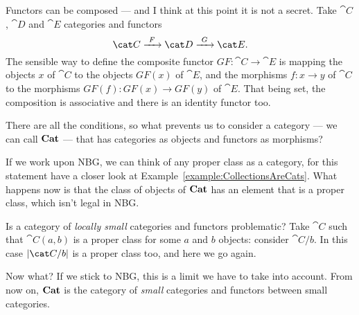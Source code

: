 
Functors can be composed --- and I think at this point it is not a
secret. Take \(\cat C\), \(\cat D\) and \(\cat E\) categories and
functors
\[\cat C \functo F \cat D \functo G \cat E .\]
The sensible way to define the composite functor
\(GF : \cat C \to \cat E\) is mapping the objects \(x\) of \(\cat C\)
to the objects \(GF(x)\) of \(\cat E\), and the morphisms
\(f : x \to y\) of \(\cat C\) to the morphisms
\(GF(f) : GF(x) \to GF(y)\) of \(\cat E\). That being set, the
composition is associative and there is an identity functor too.

There are all the conditions, so what prevents us to consider a
category --- we can call \(\bf Cat\) --- that has categories as
objects and functors as morphisms?

If we work upon NBG, we can think of any proper class as a category,
for this statement have a closer look at
Example~\ref{example:CollectionsAreCats}. What happens now is that the
class of objects of \(\bf Cat\) has an element that is a proper class,
which isn't legal in NBG.

Is a category of {\em locally small} categories and functors
problematic? Take \(\cat C\) such that \(\cat C(a, b)\) is a proper
class for some \(a\) and \(b\) objects: consider \(\cat C{/}{b}\). In
this case \(\obj{\cat C/b}\) is a proper class too, and here we go
again.

Now what? If we stick to NBG, this is a limit we have to take into
account. From now on, \(\bf Cat\) is the category of {\em small}
categories and functors between small categories.


